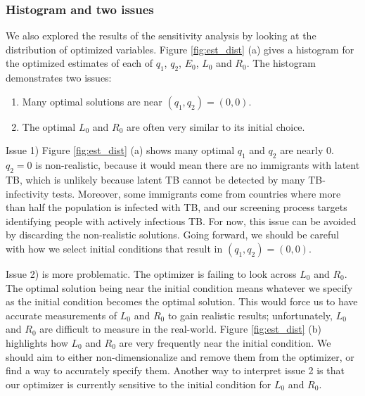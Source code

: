 \documentclass{article}
\begin{document}
	\subsubsection{Histogram and two issues}
	
	We also explored the results of the sensitivity analysis by looking at the distribution of optimized variables.  Figure \ref{fig:est_dist} (a) gives a histogram for the optimized estimates of each of $q_1$, $q_2$, $E_0$, $L_0$ and $R_0$.  The histogram demonstrates two issues:
	
	\begin{enumerate}
		\item Many optimal solutions are near $(q_1,q_2)=(0,0)$.
		\item The optimal $L_0$ and $R_0$ are often very similar to its initial choice.
	\end{enumerate}
		
Issue 1)  Figure \ref{fig:est_dist} (a) shows many optimal $q_1$ and $q_2$ are nearly 0.  $q_2=0$ is non-realistic, because it would mean there are no immigrants with latent TB, which is unlikely because latent TB cannot be detected by many TB-infectivity tests.  Moreover, some immigrants come from countries where more than half the population is infected with TB, and our screening process targets identifying people with actively infectious TB.  For now, this issue can be avoided by discarding the non-realistic solutions.  Going forward, we should be careful with how we select initial conditions that result in $(q_1,q_2)=(0,0)$.

Issue 2) is more problematic.  The optimizer is failing to look across $L_0$ and $R_0$.  The optimal solution being near the initial condition means whatever we specify as the initial condition becomes the optimal solution.  This would force us to have accurate measurements of $L_0$ and $R_0$ to gain realistic results; unfortunately, $L_0$ and $R_0$ are difficult to measure in the real-world.  Figure \ref{fig:est_dist} (b) highlights how $L_0$ and $R_0$ are very frequently near the initial condition.  We should aim to either non-dimensionalize and remove them from the optimizer, or find a way to accurately specify them.  Another way to interpret issue 2 is that our optimizer is currently sensitive to the initial condition for $L_0$ and $R_0$.
\end{document}
